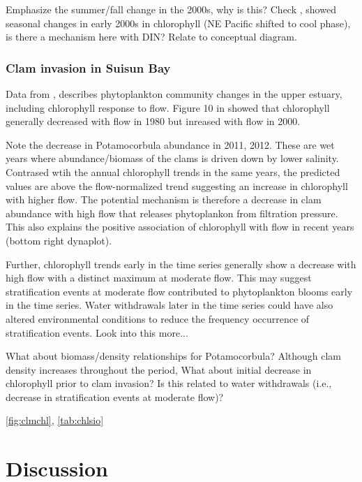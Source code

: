 \documentclass[letterpaper,12pt,oneside]{article}\usepackage[]{graphicx}\usepackage[]{color}
\begin{document}
Emphasize the summer/fall change in the 2000s, why is this?  Check \citep{Cloern07}, showed seasonal changes in early 2000s in chlorophyll (NE Pacific shifted to cool phase), is there a mechanism here with DIN? Relate to conceptual diagram.

\subsubsection{Clam invasion in Suisun Bay}
Data from \citep{Crauder16}, \citet{Jassby08} describes phytoplankton community changes in the upper estuary, including chlorophyll response to flow.  Figure 10 in \citet{Jassby08} showed that chlorophyll generally decreased with flow in 1980 but inreased with flow in 2000.

Note the decrease in Potamocorbula abundance in 2011, 2012.  These are wet years where abundance/biomass of the clams is driven down by lower salinity.  Contrased wtih the annual chlorophyll trends in the same years, the predicted values are above the flow-normalized trend suggesting an increase in chlorophyll with higher flow.  The potential mechanism is therefore a decrease in clam abundance with high flow that releases phytoplankon from filtration pressure.  This also explains the positive association of chlorophyll with flow in recent years (bottom right dynaplot). 

Further, chlorophyll trends early in the time series generally show a decrease with high flow with a distinct maximum at moderate flow.  This may suggest stratification events at moderate flow contributed to phytoplankton blooms early in the time series. Water withdrawals later in the time series could have also altered environmental conditions to reduce the frequency occurrence of stratification events.  Look into this more...

What about biomass/density relationships for Potamocorbula?  Although clam density increases throughout the period,  What about initial decrease in chlorophyll prior to clam invasion?  Is this related to water withdrawals (i.e., decrease in stratification events at moderate flow)?

\cref{fig:clmchl}, \cref{tab:chlsio}

\section{Discussion}

\clearpage
\begin{singlespace}


\end{singlespace}
\clearpage
\end{document}
